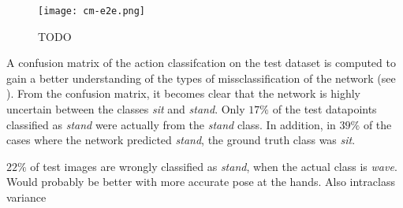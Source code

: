 \begin{figure}[htb!]
    \centering
    \texttt{[image: cm-e2e.png]}
    \caption{TODO}
    \label{fig:cm-e2e}
\end{figure}

A confusion matrix of the action classifcation on the test dataset is computed to gain a better understanding of the types of missclassification of the network (see ).
From the confusion matrix, it becomes clear that the network is highly uncertain between the classes \textit{sit} and \textit{stand}.
Only $17\%$ of the test datapoints classified as \textit{stand} were actually from the \textit{stand} class.
In addition, in $39\%$ of the cases where the network predicted \textit{stand}, the ground truth class was \textit{sit}.



$22\%$ of test images are wrongly classified as \textit{stand}, when the actual class is \textit{wave}.
Would probably be better with more accurate pose at the hands.
Also intraclass variance




